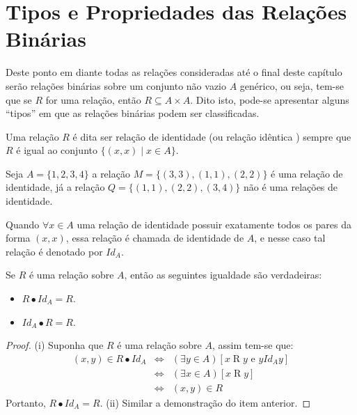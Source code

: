 \section{Tipos e Propriedades das Relações Binárias}\label{sec:TipoDasRelacoesBinarias}

Deste ponto em diante todas as relações consideradas até o final deste capítulo serão relações binárias sobre um conjunto não vazio $A$ genérico, ou seja, tem-se que se $R$ for uma relação, então $R \subseteq A \times A$. Dito isto, pode-se apresentar alguns ``tipos'' em que as relações binárias podem ser classificadas.

\begin{definition}\label{def:RelacaoIdentica}
	Uma relação $R$ é dita ser relação de identidade (ou relação idêntica \cite{abe1991-TC}) sempre que $R$ é igual ao conjunto $\{(x, x) \mid x \in A\}$.
\end{definition}

\begin{example}
	Seja $A = \{1, 2, 3, 4\}$ a relação $M = \{(3, 3), (1, 1), (2,2)\}$ é uma relação de identidade, já a relação $Q = \{(1, 1), (2,2), (3,4)\}$ não é uma relações de identidade.
\end{example}

\begin{remark}
	Quando $\forall x \in A$ uma relação de identidade possuir exatamente todos os pares da forma $(x, x)$, essa relação é chamada de identidade de $A$, e nesse caso tal relação é denotado por $Id_A$.
\end{remark}

\begin{theorem}\label{teo:NeutralidadeRelacaoIdentidade}
	Se $R$ é uma relação sobre $A$, então as seguintes igualdade são verdadeiras:
	\begin{itemize}
		\item[(i)] $R \bullet Id_A = R$.
		\item[(ii)] $Id_A \bullet R = R$.
	\end{itemize}
\end{theorem}

\begin{proof}
	(i) Suponha que $R$ é uma relação sobre $A$, assim tem-se que:
	\begin{eqnarray*}
		(x, y) \in R \bullet Id_A  & \Longleftrightarrow & (\exists y \in A)[x \mathrel{R} y \text{ e } y \mathrel{Id_A} y]\\
		& \Longleftrightarrow & (\exists x \in A)[x \mathrel{R} y]\\
		& \Longleftrightarrow & (x, y) \in R 
	\end{eqnarray*}
	Portanto,  $R \bullet Id_A = R$. (ii) Similar a demonstração do item anterior.
\end{proof}


